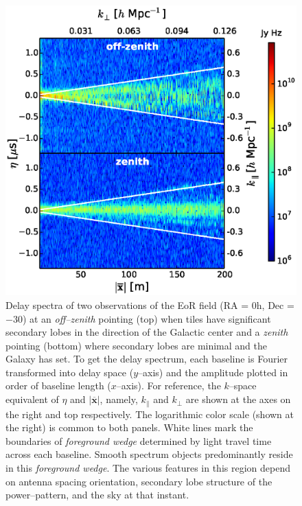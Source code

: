 \documentclass[preprint2,iop,numberedappendix]{emulateapj}
\begin{document}
\begin{figure}[htb]
\centering
\includegraphics[width=\linewidth]{figures/v1_0/multi_baseline_fhd_delay_spectrum_snapshots.eps}
\caption{Delay spectra of two observations of the EoR field (RA = 0h, Dec = $-30$\arcdeg) at an {\it off--zenith} pointing (top) when tiles have significant secondary lobes in the direction of the Galactic center and a {\it zenith} pointing (bottom) where secondary lobes are minimal and the Galaxy has set. To get the delay spectrum, each baseline is Fourier transformed into delay space ($y$--axis) and the amplitude plotted in order of baseline length ($x$--axis). For reference, the $k$--space equivalent of $\eta$ and $|\overline{\mathbf{x}}|$, namely, $k_\parallel$ and $k_\perp$ are shown at the axes on the right and top respectively. The logarithmic color scale (shown at the right) is common to both panels. White lines mark the boundaries of {\it foreground wedge} determined by light travel time across each baseline. Smooth spectrum objects predominantly reside in this {\it foreground wedge}. The various features in this region depend on antenna spacing orientation, secondary lobe structure of the power--pattern, and the sky at that instant. \label{fig:fhd_data}}
\end{figure}
\end{document}
